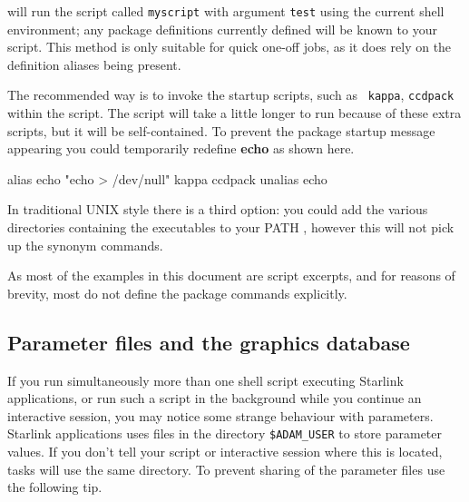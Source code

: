 \documentclass[twoside,11pt,nolof]{starlink}
\begin{document}
\begin{small}
\begin{terminalv}
\end{terminalv}
\end{small}
will run the script called \texttt{myscript} with argument \texttt{test} using
the current shell environment; any package definitions currently
defined will be known to your script.  This method is only suitable
for quick one-off jobs, as it does rely on the definition aliases being
present.

The recommended way is to invoke the startup scripts, such as {\tt
kappa}, \texttt{ccdpack} within the script.  The script will take a
little longer to run because of these extra scripts, but it will be
self-contained.  To prevent the package startup message appearing you
could temporarily redefine \textbf{echo} as shown here.

\begin{small}
\begin{terminalv}
     alias echo "echo > /dev/null"
     kappa
     ccdpack
     unalias echo
\end{terminalv}
\end{small}
In traditional UNIX style there is a third option: you could add the
various directories containing the executables to your PATH
, however this will not
pick up the synonym commands.

\begin{small}
\end{small}
As most of the examples in this document are script excerpts, and for
reasons of brevity, most do not define the package commands explicitly.

\newpage
\subsection{Parameter files and the
graphics database}\label{sc4_se_multi_param}

If you run simultaneously more than one shell script executing
Starlink applications, or run such a script in the background while
you continue an interactive session, you may notice some strange
behaviour with parameters.   Starlink applications uses files in
the directory \texttt{\$ADAM\_USER} to store parameter values.  If you don't
tell your script or interactive session where this is located,
tasks will use the same directory.  To prevent sharing of the
parameter files use the following tip.
\end{document}
